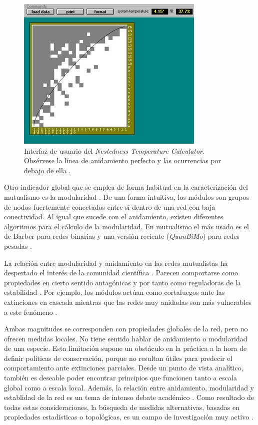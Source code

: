 \begin{figure}[h!]
\centering
\includegraphics[scale=0.66]{Figures/ESTATICA_nested_subsets.jpg}
\caption{Interfaz de usuario del \textit{Nestedness Temperature Calculator}. Obsérvese la línea de anidamiento perfecto y las ocurrencias por debajo de ella \cite{atmar1995nestedness}.}
\label{fig:ESTATICA_nested_subsets}
\end{figure}

Otro indicador global que se emplea de forma habitual en la caracterización del mutualismo es la modularidad \cite{newman2004finding, olesen2007modularity}. De una forma intuitiva, los módulos son grupos de nodos fuertemente conectados entre sí dentro de una red con baja conectividad.
Al igual que sucede con el anidamiento, existen diferentes algoritmos para el cálculo de la modularidad. En mutualismo el
más usado es el de Barber para redes binarias \cite{barber2007modularity} y una versión reciente (\textit{QuanBiMo}) para redes pesadas \cite{dormann2014method}.

La relación entre modularidad y anidamiento en las redes mutualistas ha despertado el interés de la comunidad científica \cite{olesen2007modularity, dupont2009ecological}. Parecen comportarse como propiedades en cierto sentido antagónicas y por tanto como reguladoras de la estabilidad \cite{fortuna2010nestedness}. Por ejemplo, los módulos actúan como cortafuegos ante las extinciones en cascada \cite{saavedra2011strong} mientras que las redes muy anidadas son más vulnerables a este fenómeno \cite{lever2014sudden}. 

Ambas magnitudes se corresponden con propiedades globales de la red, pero no ofrecen medidas locales. No tiene sentido hablar de anidamiento o modularidad de una especie. Esta limitación supone un obstáculo en la práctica a la hora de definir políticas de conservación, porque no resultan útiles para predecir el comportamiento ante extinciones parciales. Desde un punto de vista analítico, también es deseable poder encontrar principios que funcionen tanto a escala global como a escala local. 
Además, la relación entre anidamiento, modularidad y establidad de la red es un tema de intenso debate académico \cite{fortuna2010nestedness, james2012disentangling, staniczenko2013ghost, feng2014heterogeneity}. Como resultado de todas estas consideraciones, la búsqueda de medidas alternativas, basadas en propiedades estadísticas o topológicas, es un campo de investigación muy activo \cite{podani2014new,chagnon2015characterizing,strona2015new}.

